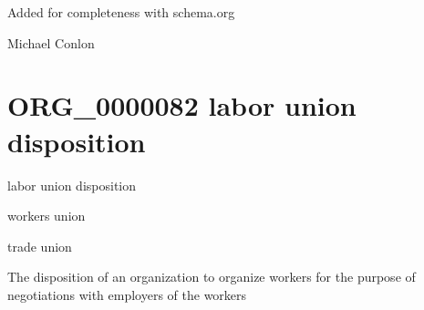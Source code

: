 \documentclass[letterpaper,10pt,english]{sphinxmanual}
\begin{document}
\begin{sphinxShadowBox}

\sphinxAtStartPar
Added for completeness with schema.org
\end{sphinxShadowBox}

\begin{sphinxShadowBox}

\sphinxAtStartPar
Michael Conlon 
\end{sphinxShadowBox}
\begin{quote}
\label{\detokenize{doc-ORG_0000082:org-0000082}}\label{\detokenize{doc-ORG_0000082:labor-union-disposition}}\label{\detokenize{doc-ORG_0000082:org-0000082}}
\ignorespaces \end{quote}


\section{ORG\_0000082 \sphinxhyphen{} labor union disposition}
\label{\detokenize{doc-ORG_0000082:org-0000082-labor-union-disposition}}\label{\detokenize{doc-ORG_0000082:index-0}}\label{\detokenize{doc-ORG_0000082::doc}}
\begin{sphinxShadowBox}

\sphinxAtStartPar
labor union disposition
\end{sphinxShadowBox}

\begin{sphinxShadowBox}

\sphinxAtStartPar
workers union

\sphinxAtStartPar
trade union
\end{sphinxShadowBox}

\begin{sphinxShadowBox}

\sphinxAtStartPar
The disposition of an organization to organize workers for the purpose of negotiations with employers of the workers
\end{sphinxShadowBox}

\begin{sphinxShadowBox}

\sphinxAtStartPar
{}
\end{sphinxShadowBox}
\end{document}
